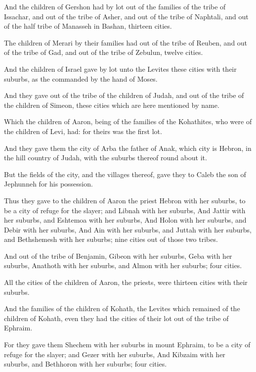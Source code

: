 \verse And the children of Gershon had by lot out of the families of the tribe of Issachar, and out of the tribe of Asher, and out of the tribe of Naphtali, and out of the half tribe of Manasseh in Bashan, thirteen cities.

\verse The children of Merari by their families had out of the tribe of Reuben, and out of the tribe of Gad, and out of the tribe of Zebulun, twelve cities.

\verse And the children of Israel gave by lot unto the Levites these cities with their suburbs, as the \LORD commanded by the hand of Moses.

\verse And they gave out of the tribe of the children of Judah, and out of the tribe of the children of Simeon, these cities which are here mentioned by name.

\verse Which the children of Aaron, being of the families of the Kohathites, who were of the children of Levi, had: for theirs was the first lot.

\verse And they gave them the city of Arba the father of Anak, which city is Hebron, in the hill country of Judah, with the suburbs thereof round about it.

\verse But the fields of the city, and the villages thereof, gave they to Caleb the son of Jephunneh for his possession.

\verse Thus they gave to the children of Aaron the priest Hebron with her suburbs, to be a city of refuge for the slayer; and Libnah with her suburbs, \verse And Jattir with her suburbs, and Eshtemoa with her suburbs, \verse And Holon with her suburbs, and Debir with her suburbs, \verse And Ain with her suburbs, and Juttah with her suburbs, and Bethshemesh with her suburbs; nine cities out of those two tribes.

\verse And out of the tribe of Benjamin, Gibeon with her suburbs, Geba with her suburbs, \verse Anathoth with her suburbs, and Almon with her suburbs; four cities.

\verse All the cities of the children of Aaron, the priests, were thirteen cities with their suburbs.

\verse And the families of the children of Kohath, the Levites which remained of the children of Kohath, even they had the cities of their lot out of the tribe of Ephraim.

\verse For they gave them Shechem with her suburbs in mount Ephraim, to be a city of refuge for the slayer; and Gezer with her suburbs, \verse And Kibzaim with her suburbs, and Bethhoron with her suburbs; four cities.


